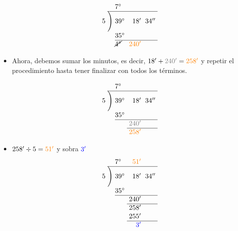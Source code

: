 \begin{example}
\begin{itemize}
		\begin{align*}
			\renewcommand\arraystretch{1.05}\renewcommand\arraycolsep{3pt}
			\begin{array}{r@{\hskip\arraycolsep}c@{\hskip\arraycolsep}l*2r} %
				 &&7^\circ & & \\
				\cline{2-5} %
			5&\Bigg)&39^\circ&18'&34''\\
			&& 35^\circ & & \\
			\cline{3-5} %
			&& \cancel{4^\circ} & \textcolor{orange}{240'}  &
			\end{array}
		\end{align*}		

		\item Ahora, debemos sumar los minutos, es decir, $18' + 
		\textcolor{gray}{240'} = \textcolor{orange}{258'}$ y repetir el 
		procedimiento hasta tener finalizar con todos los términos.

		\begin{align*}
			\renewcommand\arraystretch{1.05}\renewcommand\arraycolsep{3pt}
			\begin{array}{r@{\hskip\arraycolsep}c@{\hskip\arraycolsep}l*2r} %
				 &&7^\circ & & \\
				\cline{2-5} %
			5&\Bigg)&39^\circ&18'&34''\\
			&& 35^\circ & & \\
			\cline{3-5} %
			&&  & \textcolor{gray}{240'}  & \\
			\cline{4-5} %
			&&  & \textcolor{orange}{258'}  &
			\end{array}
		\end{align*}			

		\item $258' \div 5 = \textcolor{orange}{51'}$	y sobra $\textcolor{blue}{3'}$
		\begin{align*}
			\renewcommand\arraystretch{1.05}\renewcommand\arraycolsep{3pt}
			\begin{array}{r@{\hskip\arraycolsep}c@{\hskip\arraycolsep}l*2r} %
				 &&7^\circ & \textcolor{orange}{51'} & \\
				\cline{2-5} %
			5&\Bigg)&39^\circ&18'&34''\\
			&& 35^\circ & & \\
			\cline{3-5} %
			&&  & 240'  & \\
			\cline{4-5} %
			&&  & 258'  & \\
			&&  & 255'  & \\
			\cline{4-5} %
			&&  & \textcolor{blue}{3'}  & 
			\end{array}
		\end{align*}	


\end{itemize}
\end{example}
